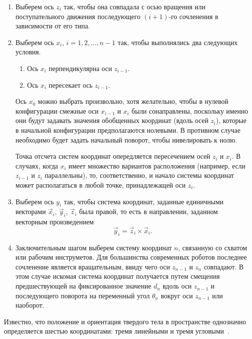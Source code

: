 \documentclass[oneside, final, 14pt]{extarticle}
\begin{document}
\begin{enumerate}
  \item Выберем ось \(z_i\)	так, чтобы она совпадала с осью вращения или поступательного движения последующего \((i + 1)\)-го сочленения в зависимости от его типа.
  \item Выберем ось \(x_i\), \(i = 1, 2, \ldots, n - 1\) так, чтобы выполнялись два следующих условия.
  \begin{enumerate}
    \item Ось \(x_i\) перпендикулярна оси \(z_{i-1}\).
	\item Ось \(x_i\) пересекает ось \(z_{i - 1}\).
  \end{enumerate}
  Ось \(x_0\) можно выбрать произвольно, хотя желательно, чтобы в нулевой конфигурации смежные оси \(x_{i-1}\) и \(x_i\) были сонаправлены, поскольку именно они будут задавать значения обобщенных координат (вдоль осей \(z_i\)), которые в начальной конфигурации предполагаются нолевыми.
  В противном случае необходимо будет задать начальный поворот, чтобы нивелировать к нолю.
  \par
  Точка отсчета систем координат опередляется пересечением осей \(z_i\)  и \(x_i\).
  В случаях, когда \(x_i\) имеет множество вариантов расположения (например, если \(z_{i-1}\) и \(z_i\) параллельны), то, соответственно, и начало системы координат может располагаться в любой точке, принадлежащей оси \(z_i\).
  \item Выберем ось \(y_i\) так, чтобы система координат, заданные единичными векторами \(\vec{x}_i,\,\vec{y}_i,\,\vec{z}_i\) была правой, то есть в направлении, заданном векторным произведением
  \begin{displaymath}
    \vec{y}_i = \vec{z}_i \times \vec{x}_i
	.
  \end{displaymath}
  \item Заключительным шагом выберем систему координат \(n\), связанную со схватом или рабочим инструметов.
  Для большинства современных роботов последнее сочленение является вращательным, ввиду чего оси \(z_{n - 1}\) и \(z_n\) совпадают. В этом случае искомая система координат получается путем смещения предшествующей на фиксированное значение \(d_n\) вдоль оси \(z_{n - 1}\) и последующего поворота на переменный угол \(\theta_n\) вокруг оси \(z_{n-1}\) или наоборот.
\end{enumerate}
\par
Известно, что положение и ориентация твердого тела в пространстве однозначно определяется шестью координатами: тремя линейными и тремя угловыми~\cite{borisov:mod_rob}. \label{p:dh-param}
\end{document}
